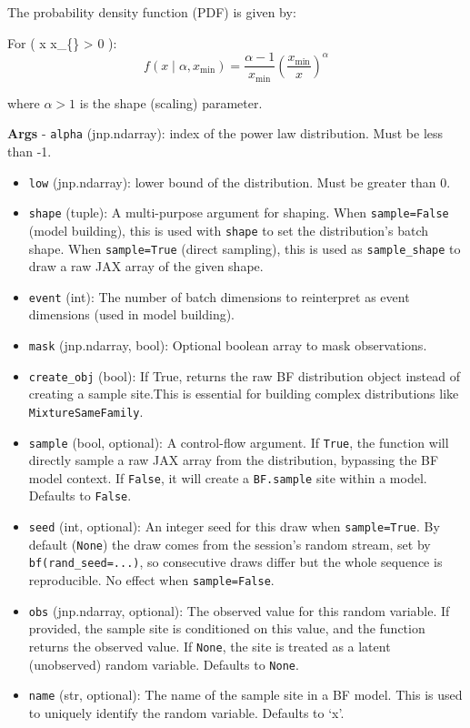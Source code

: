 \documentclass[
  letterpaper,
  DIV=11,
  numbers=noendperiod]{scrartcl}
\begin{document}
The probability density function (PDF) is given by:

For ( x \ge x\_\{\min\} \textgreater{} 0 ): \[
  f(x \mid \alpha, x_{\min}) = \frac{\alpha - 1}{x_{\min}} \left( \frac{x_{\min}}{x} \right)^{\alpha}
  \]

where \(\alpha > 1\) is the shape (scaling) parameter.

\textbf{Args} - \texttt{alpha} (jnp.ndarray): index of the power law
distribution. Must be less than -1.

\begin{itemize}
\item
  \texttt{low} (jnp.ndarray): lower bound of the distribution. Must be
  greater than 0.
\item
  \texttt{shape} (tuple): A multi-purpose argument for shaping. When
  \texttt{sample=False} (model building), this is used with
  \texttt{shape} to set the distribution's batch shape. When
  \texttt{sample=True} (direct sampling), this is used as
  \texttt{sample\_shape} to draw a raw JAX array of the given shape.
\item
  \texttt{event} (int): The number of batch dimensions to reinterpret as
  event dimensions (used in model building).
\item
  \texttt{mask} (jnp.ndarray, bool): Optional boolean array to mask
  observations.
\item
  \texttt{create\_obj} (bool): If True, returns the raw BF distribution
  object instead of creating a sample site.This is essential for
  building complex distributions like \texttt{MixtureSameFamily}.
\item
  \texttt{sample} (bool, optional): A control-flow argument. If
  \texttt{True}, the function will directly sample a raw JAX array from
  the distribution, bypassing the BF model context. If \texttt{False},
  it will create a \texttt{BF.sample} site within a model. Defaults to
  \texttt{False}.
\item
  \texttt{seed} (int, optional): An integer seed for this draw when
  \texttt{sample=True}. By default (\texttt{None}) the draw comes from
  the session's random stream, set by \texttt{bf(rand\_seed=...)}, so
  consecutive draws differ but the whole sequence is reproducible. No
  effect when \texttt{sample=False}.
\item
  \texttt{obs} (jnp.ndarray, optional): The observed value for this
  random variable. If provided, the sample site is conditioned on this
  value, and the function returns the observed value. If \texttt{None},
  the site is treated as a latent (unobserved) random variable. Defaults
  to \texttt{None}.
\item
  \texttt{name} (str, optional): The name of the sample site in a BF
  model. This is used to uniquely identify the random variable. Defaults
  to `x'.
\end{itemize}
\end{document}
